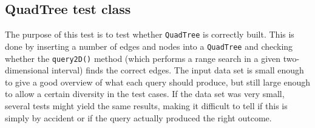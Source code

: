 \subsection{QuadTree test class}
The purpose of this test is to test whether \texttt{QuadTree} is correctly built. This is done by inserting a number of edges and nodes into a \texttt{QuadTree} and checking whether the \texttt{query2D()} method (which performs a range search in a given two-dimensional interval) finds the correct edges. The input data set is small enough to give a good overview of what each query should produce, but still large enough to allow a certain diversity in the test cases. If the data set was very small, several tests might yield the same results, making it difficult to tell if this is simply by accident or if the query actually produced the right outcome.
